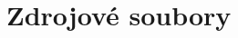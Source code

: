 \documentclass[12pt,notitlepage,fleqn]{report} %
\theoremstyle{definition}
\newcommand{\nt}[1]{\langle #1 \rangle} %
\begin{document}
% 

  \eject
  \section{Zdrojové soubory}
\end{document}
